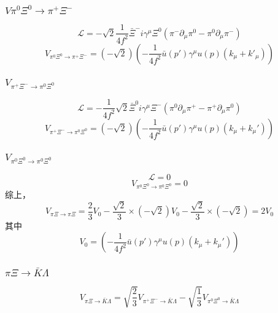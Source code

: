 \subsubsection{$V\pi^{0}\Xi^{0}\to\pi^{+}\Xi^{-}$}
\begin{equation}
	\mathcal{L}=-\sqrt{2}\frac{1}{4f^2}\bar{\Xi}^{-}i\gamma^{\mu}\Xi^{0}(\pi^{-}\partial_{\mu}\pi^{0}-\pi^{0}\partial_{\mu}\pi^{-})
\end{equation}
\begin{equation}
	V_{\pi^{0}\Xi^{0}\to\pi^{+}\Xi^{-}}=\left(-\sqrt{2}\right)\left(-\frac{1}{4f^2}\bar{u}(p')\gamma^{\mu}u(p)(k_{\mu}+k'_{\mu})\right)
\end{equation}
\subsubsection{$V_{\pi^{+}\Xi^{-}\to\pi^{0}\Xi^{0}}$}
\begin{equation}
	\mathcal{L}=-\frac{1}{4f^2}\sqrt{2}\bar{\Xi}^{0}i\gamma^{\mu}\Xi^{-}(\pi^{0}\partial_{\mu}\pi^{+}-\pi^{+}\partial_{\mu}\pi^{0})
\end{equation}
\begin{equation}
	V_{\pi^{+}\Xi^{-}\to\pi^{0}\Xi^{0}}={\left(-\sqrt{2}\right)\left(-\frac{1}{4f^2}\bar{u}(p')\gamma^{\mu}u(p)(k_{\mu}+k_{\mu}')\right)}
\end{equation}
\subsubsection{$V_{\pi^{0}\Xi^{0}\to\pi^{0}\Xi^{0}}$}
\begin{equation}
	\mathcal{L}=0
\end{equation}
\begin{equation}
	V_{\pi^{0}\Xi^{0}\rightarrow\pi^{0}\Xi^{0}}=0
\end{equation}
综上，
\begin{equation}
	V_{\pi\Xi\rightarrow\pi\Xi}=\frac{2}{3}V_{0}-\frac{\sqrt{2}}{3}\times(-\sqrt{2})V_{0}-\frac{\sqrt{2}}{3}\times(-\sqrt{2})=2V_{0}
\end{equation}
其中
\begin{equation}
V_{0}=\left(-\frac{1}{4f^2}\bar{u}(p')\gamma^{\mu}u(p)(k_{\mu}+k_{\mu}')\right)
\end{equation}
\subsubsection{$\pi\Xi\to \bar{K}\Lambda$}
\begin{equation}
	V_{\pi\Xi\to \bar{K}\Lambda}=\sqrt{\frac{2}{3}}V_{\pi^{+}\Xi^{-}\rightarrow \bar{K}\Lambda}-\sqrt{\frac{1}{3}}V_{\pi^{0}\Xi^{0}\rightarrow \bar{K}\Lambda}
\end{equation}
